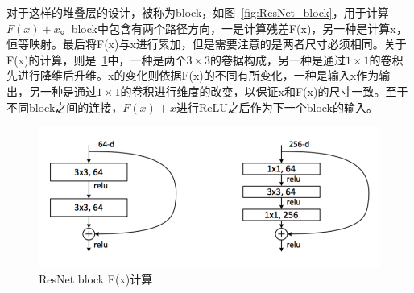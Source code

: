 对于这样的堆叠层的设计，被称为block，如图~\ref{fig:ResNet_block}，用于计算$F(x)+x$。block中包含有两个路径方向，一是计算残差F(x)，另一种是计算x，恒等映射。最后将F(x)与x进行累加，但是需要注意的是两者尺寸必须相同。关于F(x)的计算，则是~\ref{fig:ResNet_block_Fx}中，一种是两个$3\times3$的卷据构成，另一种是通过$1\times1$的卷积先进行降维后升维。x的变化则依据F(x)的不同有所变化，一种是输入x作为输出，另一种是通过$1\times1$的卷积进行维度的改变，以保证x和F(x)的尺寸一致。至于不同block之间的连接，$F(x)+x$进行ReLU之后作为下一个block的输入。

\begin{figure}[htbp]
	\centering
	\includegraphics[width=\linewidth]{readings_figures/ResNet_block_Fx.jpeg}
	\caption{ResNet block F(x)计算}
	\label{fig:ResNet_block_Fx}
\end{figure}

